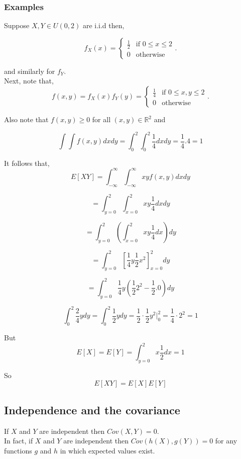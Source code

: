\documentclass[12pt,a4paper]{article}
\theoremstyle{regla}
\theoremstyle{remark}
\theoremstyle{definition}
\theoremstyle{nonumberbreak}
\begin{document}
\subsubsection{Examples}
\begin{xmpl}
Suppose $X,Y \in U (0,2)$ are  i.i.d then,

$$
f_X (x) = 
\begin{cases}
  \frac{1}{2} & \text{if } 0 \leq x \leq 2 \\
  0 &\text{otherwise}
\end{cases}.
$$

and similarly for $f_Y$.\\

Next, note that,
$$
f(x,y) =  f_X (x) f_Y (y) = 
\begin{cases}
  \frac{1}{4} &\text{if } 0 \leq x,y \leq 2\\
  0 &\text{otherwise}
\end{cases}.
$$

Also note that $f(x,y) \geq 0$ for all $ (x,y) \in \mathbb{R}^2 $ and 

$$\int\int  f(x,y)dxdy = \int_{0}^{2}\int_{0}^{2} \frac {1}{4} dxdy =  \frac {1}{4}.4 = 1$$

It follows that,
$$ E [X Y] = \int_{-\infty}^{\infty}\int_{-\infty}^{\infty} xy f(x,y) dxdy$$

$$ = \int_{y=0}^{2}\int_{x=0}^{2} xy \frac {1}{4}dxdy $$

$$ = \int_{y=0}^{2} (\int_{x=0}^{2} xy \frac {1}{4} dx) dy$$

$$= \int_{y=0}^{2} [\frac {1}{4}y \frac {1}{2}x^2]_{x=0}^ {2} dy $$

 

$$ = \int_{y=0}^{2} \frac {1}{4}y (\frac {1}{2} 2^2 - \frac {1}{2}.0) dy$$

$$ \int_{0}^{2} \frac {2}{4}y dy = \int_{0}^{2} \frac {1}{2}y dy = \frac {1}{2}\cdot \frac {1}{2} y^2 | _{0}^2 = \frac {1}{4}\cdot 2^2 = 1 $$

But $$ E [X] = E[Y] = \int_{y=0}^{2} x \frac {1}{2} dx = 1$$

So $$E[XY] = E [X] E[Y] $$

\end{xmpl}




\subsection{Independence and the covariance}
\begin{fbox}
\begin{minipage}{0.97\textwidth}
If $X$ and $Y$ are independent then $Cov(X,Y)=0$.\\

In fact, if $X$ and $Y$ are independent then $Cov(h(X),g(Y))=0$ for any functions $g$ and $h$ in which expected values exist.

\end{minipage}
\end{fbox}
\end{document}
